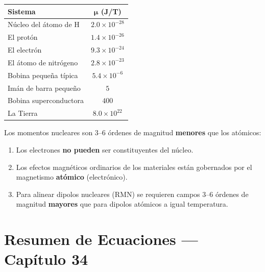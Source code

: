 \documentclass[12pt, letterpaper]{report}
\numberwithin{equation}{section}
\begin{document}
\begin{center}
\begin{tabular}{lc}
  \toprule
  \textbf{Sistema} & $\boldsymbol{\mu}$ \textbf{(J/T)} \\
  \midrule
  Núcleo del átomo de H        & $2.0\times10^{-28}$ \\
  El protón                    & $1.4\times10^{-26}$ \\
  El electrón                  & $9.3\times10^{-24}$ \\
  El átomo de nitrógeno        & $2.8\times10^{-23}$ \\
  Bobina pequeña típica        & $5.4\times10^{-6}$  \\
  Imán de barra pequeño        & $5$                 \\
  Bobina superconductora       & $400$               \\
  La Tierra                    & $8.0\times10^{22}$  \\
  \bottomrule
\end{tabular}
\end{center}

\begin{tcolorbox}[propbox,
  title=Consecuencias de la comparación nuclear vs.\ atómica]
  Los momentos nucleares son $3$–$6$ órdenes de magnitud \textbf{menores}
  que los atómicos:
  \begin{enumerate}[leftmargin=1.8em, itemsep=2pt]
    \item Los electrones \textbf{no pueden} ser constituyentes del núcleo.
    \item Los efectos magnéticos ordinarios de los materiales están
          gobernados por el magnetismo \textbf{atómico} (electrónico).
    \item Para alinear dipolos nucleares (RMN) se requieren campos
          $3$–$6$ órdenes de magnitud \textbf{mayores} que para dipolos
          atómicos a igual temperatura.
  \end{enumerate}
\end{tcolorbox}

\section*{Resumen de Ecuaciones — Capítulo 34}
\end{document}

